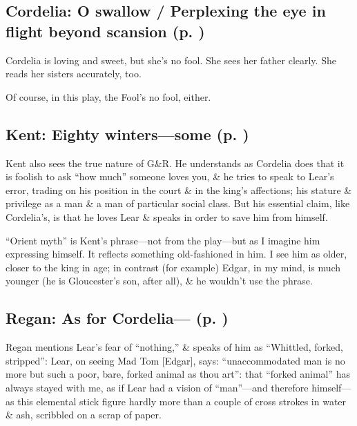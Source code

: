 \subsection*{Cordelia: O swallow / Perplexing the eye in flight beyond scansion (p. \pageref{ch:lear_af})}
Cordelia is loving and sweet, but she's no fool. She sees her father clearly. She reads her sisters accurately, too.

Of course, in this play, the Fool's no fool, either.

\subsection*{Kent: Eighty winters---some (p. \pageref{ch:lear_ag})}
Kent also sees the true nature of G\&R. He understands as Cordelia does that it is foolish to ask ``how much'' someone loves you, \& he tries to speak to Lear's error, trading on his position in the court \& in the king's affections; his stature \& privilege as a man \& a man of particular social class. But his essential claim, like Cordelia's, is that he loves Lear \& speaks in order to save him from himself.

``Orient myth'' is Kent's phrase---not from the play---but as I imagine him expressing himself. It reflects something old-fashioned in him. I see him as older, closer to the king in age; in contrast (for example) Edgar, in my mind, is much younger (he is Gloucester's son, after all), \& he wouldn't use the phrase.

\subsection*{Regan: As for Cordelia--- (p. \pageref{ch:lear_ah})}
Regan mentions Lear's fear of ``nothing,'' \& speaks of him as ``Whittled, forked, stripped'': Lear, on seeing Mad Tom {[}Edgar{]}, says: ``unaccommodated man is no more but such a poor, bare, forked animal as thou art'': that ``forked animal'' has always stayed with me, as if Lear had a vision of ``man''---and therefore himself---as this elemental stick figure hardly more than a couple of cross strokes in water \& ash, scribbled on a scrap of paper.

